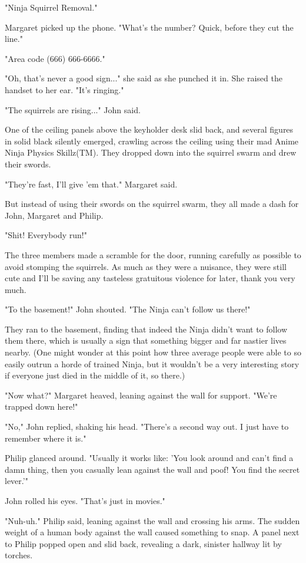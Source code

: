 \documentclass[10pt]{article}
\begin{document}
"Ninja Squirrel Removal."

Margaret picked up the phone. "What's the number? Quick, before they cut the line."

"Area code (666) 666-6666."

"Oh, that's never a good sign..." she said as she punched it in. She raised the handset to her ear. "It's ringing."

"The squirrels are rising..." John said.

One of the ceiling panels above the keyholder desk slid back, and several figures in solid black silently emerged, crawling across the ceiling using their mad Anime Ninja Physics Skillz(TM). They dropped down into the squirrel swarm and drew their swords.

"They're fast, I'll give 'em that." Margaret said.

But instead of using their swords on the squirrel swarm, they all made a dash for John, Margaret and Philip.

"Shit! Everybody run!"

The three members made a scramble for the door, running carefully as possible to avoid stomping the squirrels. As much as they were a nuisance, they were still cute and I'll be saving any tasteless gratuitous violence for later, thank you very much.

"To the basement!" John shouted. "The Ninja can't follow us there!"

They ran to the basement, finding that indeed the Ninja didn't want to follow them there, which is usually a sign that something bigger and far nastier lives nearby. (One might wonder at this point how three average people were able to so easily outrun a horde of trained Ninja, but it wouldn't be a very interesting story if everyone just died in the middle of it, so there.)

"Now what?" Margaret heaved, leaning against the wall for support. "We're trapped down here!"

"No," John replied, shaking his head. "There's a second way out. I just have to remember where it is."

Philip glanced around. "Usually it works like: 'You look around and can't find a damn thing, then you casually lean against the wall and poof! You find the secret lever.'"

John rolled his eyes. "That's just in movies."

"Nuh-uh." Philip said, leaning against the wall and crossing his arms. The sudden weight of a human body against the wall caused something to snap. A panel next to Philip popped open and slid back, revealing a dark, sinister hallway lit by torches.
\end{document}
